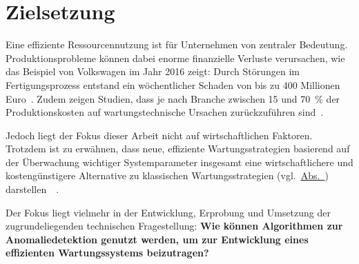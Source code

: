 \chapter{Zielsetzung}\label{ch:zielsetzung}
Eine effiziente Ressourcennutzung ist für Unternehmen von zentraler Bedeutung. Produktionsprobleme können dabei enorme finanzielle
Verluste verursachen, wie das Beispiel von Volkswagen im Jahr 2016 zeigt: Durch Störungen im Fertigungsprozess entstand ein wöchentlicher
Schaden von bis zu 400 Millionen Euro~\cite{Krupitzer2020}. Zudem zeigen Studien, dass je nach Branche zwischen 15 und 70~\% der
Produktionskosten auf wartungstechnische Ursachen zurückzuführen sind~\cite{Bevilacqua2000}.

Jedoch liegt der Fokus dieser Arbeit nicht auf wirtschaftlichen Faktoren. Trotzdem ist zu erwähnen, dass neue, effiziente
Wartungsstrategien basierend auf der Überwachung wichtiger Systemparameter insgesamt eine wirtschaftlichere und kostengünstigere
Alternative zu klassischen Wartungsstrategien (vgl.~\hyperref[sec:trad_maintenance]{Abs.~})
darstellen~\cite{Deloux2009}~\Cite[S.~64--65]{Mobley2002}.

Der Fokus liegt vielmehr in der Entwicklung, Erprobung und Umsetzung der zugrundeliegenden technischen Fragestellung: \textbf{Wie können
Algorithmen zur Anomaliedetektion genutzt werden, um zur Entwicklung eines effizienten Wartungssystems
beizutragen?}

